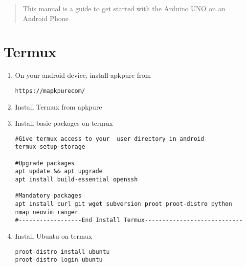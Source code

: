 \documentclass[journal,2pt,twocolumn]{IEEEtran}
\begin{document}
\tableofcontents

\bigskip

\begin{abstract}
This manual is a guide to get started with the Arduino UNO on an Android Phone
\end{abstract}




%
\fi

\section{Termux}
\begin{enumerate}
	\item On your android device, install apkpure from 
\begin{lstlisting}
https://mapkpurecom/
\end{lstlisting}
\item Install Termux from apkpure
\item Install basic packages on termux 
\begin{lstlisting}
#Give termux access to your  user directory in android
termux-setup-storage

#Upgrade packages
apt update && apt upgrade
apt install build-essential openssh

#Mandatory packages
apt install curl git wget subversion proot proot-distro python  nmap neovim ranger
#------------------End Install Termux----------------------------
\end{lstlisting}
\item Install Ubuntu on termux 
\begin{lstlisting}
proot-distro install ubuntu
proot-distro login ubuntu
\end{lstlisting}
\end{enumerate}
\end{document}
